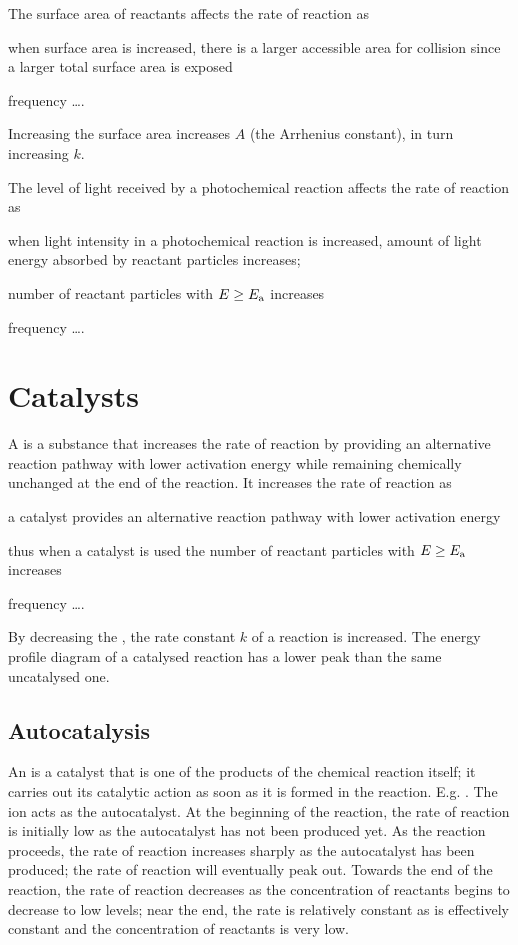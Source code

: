\documentclass[Chemistry.tex]{subfiles}
\begin{document}
The surface area of reactants affects the rate of reaction as \begin{slinenum}
\item when surface area is increased, there is a larger accessible area for collision since a larger total surface area is exposed
\item frequency \ldots{}.
\end{slinenum} Increasing the surface area increases \(A\) (the Arrhenius constant), in turn increasing \(k\).

The level of light received by a photochemical reaction affects the rate of reaction as \begin{slinenum}
\item when light intensity in a photochemical reaction is increased, amount of light energy absorbed by reactant particles increases;
\item number of reactant particles with \(E \ge \slEa\) increases
\item frequency \ldots{}.
\end{slinenum}
\section{Catalysts}
A  is a substance that increases the rate of reaction by providing an alternative reaction pathway with lower activation energy while remaining chemically unchanged at the end of the reaction. It increases the rate of reaction as \begin{slinenum}
\item a catalyst provides an alternative reaction pathway with lower activation energy
\item thus when a catalyst is used the number of reactant particles with \(E \ge \slEa\) increases
\item frequency \ldots{}.
\end{slinenum} By decreasing the \slEa{}, the rate constant \(k\) of a reaction is increased. The energy profile diagram of a catalysed reaction has a lower peak than the same uncatalysed one.
\subsection{Autocatalysis}
An  is a catalyst that is one of the products of the chemical reaction itself; it carries out its catalytic action as soon as it is formed in the reaction. E.g. . The  ion acts as the autocatalyst. At the beginning of the reaction, the rate of reaction is initially low as the autocatalyst  has not been produced yet. As the reaction proceeds, the rate of reaction increases sharply as the autocatalyst  has been produced; the rate of reaction will eventually peak out. Towards the end of the reaction, the rate of reaction decreases as the concentration of reactants begins to decrease to low levels; near the end, the rate is relatively constant as  is effectively constant and the concentration of reactants is very low.
\end{document}
